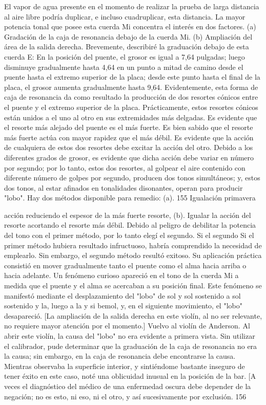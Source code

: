 El vapor de agua presente en el momento de realizar la prueba de larga distancia al aire libre podría duplicar, e incluso cuadruplicar, esta distancia.
La mayor potencia tonal que posee esta cuerda Mi concentra el interés en dos factores.
(a) Gradación de la caja de resonancia debajo de la cuerda Mi.
(b) Ampliación del área de la salida derecha. Brevemente, describiré la graduación debajo de esta cuerda E: En la posición del puente, el grosor es igual a 7,64 pulgadas; luego disminuye gradualmente hasta 4,64 en un punto a mitad de camino desde el puente hasta el extremo superior de la placa; desde este punto hasta el final de la placa, el grosor aumenta gradualmente hasta 9,64. Evidentemente, esta forma de caja de resonancia da como resultado la producción de dos resortes cónicos entre el puente y el extremo superior de la placa. Prácticamente, estos resortes cónicos están unidos a
el uno al otro en sus extremidades más delgadas.
Es evidente que el resorte más alejado del puente es el más fuerte. Es bien sabido que el resorte más fuerte actúa con mayor rapidez que el más débil. Es evidente que la acción de cualquiera de estos dos resortes debe excitar la acción del otro. Debido a los diferentes grados de grosor, es evidente que dicha acción debe variar en número por segundo; por lo tanto, estos dos resortes, al golpear el aire contenido con diferente número de golpes por segundo, producen dos tonos simultáneos; y, estos dos tonos, al estar afinados en tonalidades disonantes, operan para producir "lobo". Hay dos métodos
disponible para remedio:	(a). 155	Igualación	primavera

acción reduciendo el espesor de la más fuerte
resorte, (b). Igualar la acción del resorte acortando el resorte más débil. Debido al peligro de debilitar la potencia del tono con el primer método, por lo tanto elegí el segundo. Si el segundo
Si el primer método hubiera resultado infructuoso, habría comprendido la necesidad de emplearlo. Sin embargo, el segundo método resultó exitoso. Su aplicación práctica consistió en mover gradualmente tanto el puente como el alma hacia arriba o hacia adelante. Un fenómeno curioso apareció en el tono de la cuerda Mi a medida que el puente y el alma se acercaban a su posición final. Este fenómeno se manifestó mediante el desplazamiento del "lobo" de sol y sol sostenido a sol sostenido y la, luego a la y si bemol, y, en el siguiente movimiento, el "lobo" desapareció.
[La ampliación de la salida derecha en este violín, al no ser relevante, no requiere mayor atención por el momento.]
Vuelvo al violín de Anderson.
Al abrir este violín, la causa del "lobo" no era evidente a primera vista. Sin utilizar el calibrador, pude determinar que la graduación de la caja de resonancia no era la causa; sin embargo, en la caja de resonancia debe encontrarse la causa. Mientras observaba la superficie interior, y sintiéndome bastante inseguro de tener éxito en este caso, noté una oblicuidad inusual en la posición de la
bar.
[A veces el diagnóstico del médico de una enfermedad oscura debe depender de la negación; no es esto,
ni eso, ni el otro, y así sucesivamente por exclusión.
156

